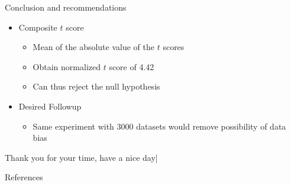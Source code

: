 \documentclass{beamer}
\begin{document}
\begin{frame}{Conclusion and recommendations}
  \begin{itemize}
  \item Composite $t$ score
    \begin{itemize}
     \item Mean of the absolute value of the $t$ scores
     \item Obtain normalized $t$ score of 4.42
     \item Can thus reject the null hypothesis
  \end{itemize}
  \end{itemize}
  \begin{itemize}
     \item Desired Followup
       \begin{itemize}
       \item Same experiment with 3000 datasets would remove possibility of
         data bias
       \end{itemize}
  \end{itemize}
\end{frame}

\begin{frame}[focus]
	Thank you for your time, have a nice day|
\end{frame}

\begin{frame}{References}
	\nocite{*} %
\end{frame}
\end{document}

